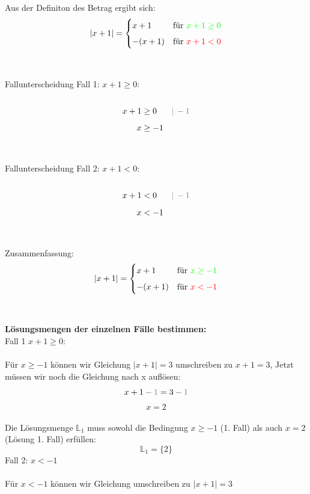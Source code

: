 \documentclass[a4paper,10pt]{article}
\begin{document}
\begin{multicols}{3}
    Aus der Definiton des Betrag ergibt sich: \\
    \begin{equation*} |x + 1| = \begin{cases} x + 1 &\text{für } {\color{green}x + 1 \geq 0} \\[5px] -(x + 1) &\text{für } {\color{red}x + 1 < 0} \end{cases} \end{equation*}\\~\\
    Fallunterscheidung Fall 1: $x + 1\geq 0$:\\~\\
    \begin{align*} x + 1 &\geq 0 &&{\color{gray}|\, -1} \\[5px] x &\geq -1 \end{align*}\\~\\
    Fallunterscheidung Fall 2: $x + 1 < 0$:\\~\\
    \begin{align*} x + 1 &< 0 &&{\color{gray}|\, -1} \\[5px] x &< -1 \end{align*}\\~\\
    Zusammenfassung:
    \begin{equation*} |x + 1| = \begin{cases} x + 1 &\text{für } {\color{green}x \geq -1} \\[5px] -(x + 1) &\text{für } {\color{red}x < -1} \end{cases} \end{equation*}\\~\\
    \textbf{Lösungsmengen der einzelnen Fälle bestimmen:} \\
    Fall 1 $x + 1\geq 0$:\\~\\
    Für $x \geq -1$ können wir Gleichung $|x + 1| = 3$ umschreiben zu $x + 1 = 3$, Jetzt müssen wir noch die Gleichung nach x auflösen:
    \[x + 1 {\color{gray}\:-\:1} = 3 {\color{gray}\:-\:1}\]
    \[x = 2\] \\
    Die Lösungsmenge $\mathbb{L}_1$ muss sowohl die Bedingung $x \geq -1$ (1. Fall) als auch $x = 2$ (Lösung 1. Fall) erfüllen:
    \[\mathbb{L}_1 = \{2\}\]
    Fall 2: $x < -1$ \\~\\
    Für  $x < -1$ können wir Gleichung umschreiben zu $|x + 1| = 3$ \\

\end{multicols}
\end{document}
